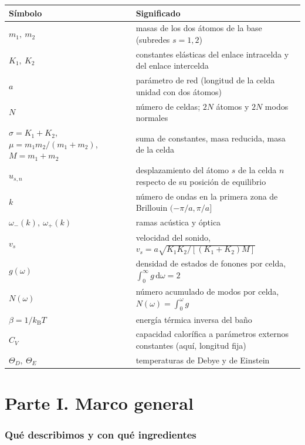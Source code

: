 \documentclass[11pt,a4paper]{article}
\newcommand{\kB}{k_{\mathrm B}}
\newcommand{\dd}{\mathrm{d}}
\newcommand{\vs}{v_{s}}
\begin{document}
\begin{center}
\small
\begin{tabularx}{\textwidth}{@{}l X@{}}
\toprule
Símbolo & Significado \\
\midrule
$m_1,\ m_2$ & masas de los dos átomos de la base (subredes $s=1,2$)\\
$K_1,\ K_2$ & constantes elásticas del enlace intracelda y del enlace intercelda\\
$a$ & parámetro de red (longitud de la celda unidad con dos átomos)\\
$N$ & número de celdas; $2N$ átomos y $2N$ modos normales\\
$\sigma=K_1+K_2$,\ $\mu=m_1m_2/(m_1+m_2)$,\ $M=m_1+m_2$ & suma de constantes, masa reducida, masa de la celda\\
$u_{s,n}$ & desplazamiento del átomo $s$ de la celda $n$ respecto de su posición de equilibrio\\
$k$ & número de ondas en la primera zona de Brillouin $(-\pi/a,\pi/a]$\\
$\omega_-(k),\ \omega_+(k)$ & ramas acústica y óptica\\
$\vs$ & velocidad del sonido, $\vs=a\sqrt{K_1K_2/[(K_1+K_2)M]}$\\
$g(\omega)$ & densidad de estados de fonones por celda, $\int_0^\infty g\,\dd\omega=2$\\
$N(\omega)$ & número acumulado de modos por celda, $N(\omega)=\int_0^\omega g$\\
$\beta=1/\kB T$ & energía térmica inversa del baño\\
$C_V$ & capacidad calorífica a parámetros externos constantes (aquí, longitud fija)\\
$\Theta_D,\ \Theta_E$ & temperaturas de Debye y de Einstein\\
\bottomrule
\end{tabularx}
\end{center}

\part*{Parte I. Marco general}

\section{Qué describimos y con qué ingredientes}
\end{document}
